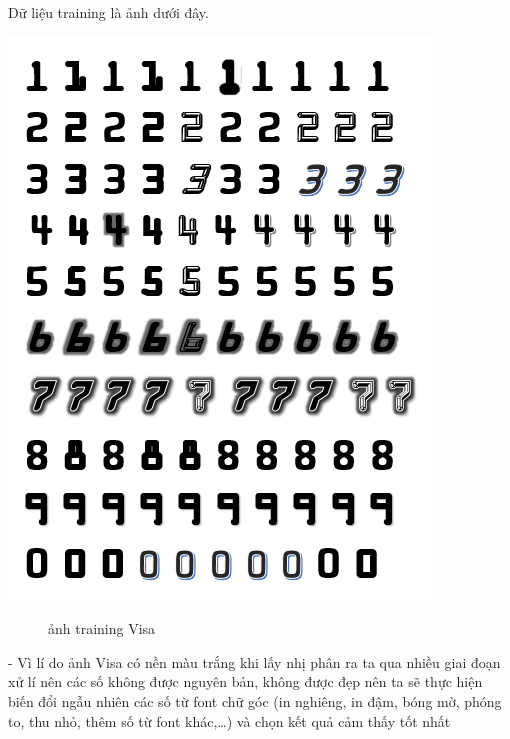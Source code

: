     \quad Dữ liệu training là ảnh dưới đây.
\begin{center}
    \includegraphics[scale = 1.2]{images/visa/training.png}
\end{center}
\begin{figure}[htp]
    \caption{ảnh training Visa}
\end{figure}

-	Vì lí do ảnh Visa có nền màu trắng khi lấy nhị phân ra ta qua nhiều giai đoạn xử lí nên các số không được nguyên bản, không được đẹp nên ta sẽ thực hiện biến đổi ngẫu nhiên các số từ font chữ góc (in nghiêng, in đậm, bóng mờ, phóng to, thu nhỏ, thêm số từ font khác,…) và chọn kết quả cảm thấy tốt nhất

